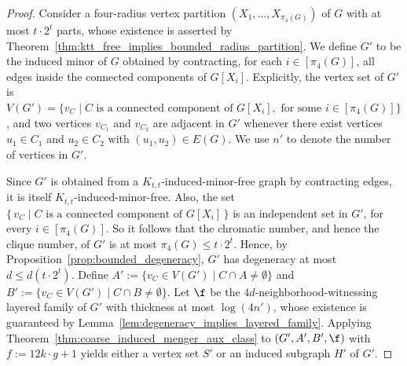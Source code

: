 \begin{proof}
    Consider a four-radius vertex partition $(X_1,\dots,X_{\pi_4(G)})$ of $G$ with at most $t\cdot 2^t$ parts, whose existence is asserted by Theorem~\ref{thm:ktt_free_implies_bounded_radius_partition}. We define $G'$ to be the induced minor of $G$ obtained by contracting, for each $i \in [\pi_4(G)]$, all edges inside the connected components of $G[X_i]$. Explicitly, the vertex set of $G'$ is $V(G') = \{ v_{C} \mid C \text{ is a connected component of } G[X_i], \text{ for some }i \in [\pi_4(G)] \}$, and two vertices $v_{C_1}$ and $v_{C_2}$ are adjacent in $G'$ whenever there exist vertices $u_1 \in C_1$ and $u_2 \in C_2$ with $(u_1,u_2) \in E(G)$. We use $n'$ to denote the number of vertices in $G'$.

    Since $G'$ is obtained from a $K_{t,t}$-induced-minor-free graph by contracting edges, it is itself $K_{t,t}$-induced-minor-free. Also, the set $\{\,v_{C}\mid C \text{ is a connected component of } G[X_i]\,\}$ is an independent set in $G'$, for every $i \in [\pi_4(G)]$. So it follows that the chromatic number, and hence the clique number, of $G'$ is at most $\pi_4(G) \leq t \cdot 2^{t}$. Hence, by Proposition~\ref{prop:bounded_degeneracy}, $G'$ has degeneracy at most $d \leq d(t\cdot 2^t)$.
    Define $A' := \{v_{C} \in V(G') \mid C \cap A \neq \emptyset\}$ and $B' := \{v_{C} \in V(G') \mid C \cap B \neq \emptyset\}$. Let $\f$ be the $4d$-neighborhood-witnessing layered family of $G'$ with thickness at most $\log (4n')$, whose existence is guaranteed by Lemma~\ref{lem:degeneracy_implies_layered_family}. Applying Theorem~\ref{thm:coarse_induced_menger_aux_class} to $(G',A',B',\f)$ with $f := 12k\cdot g + 1$ yields either a vertex set $S'$ or an induced subgraph $H'$ of $G'$.  
    


\end{proof}
